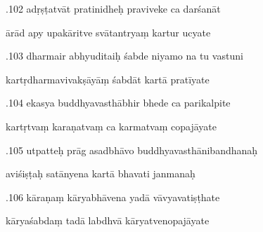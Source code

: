 \documentclass[article,12pt,a4paper]{memoir}%
\newcounter{parCount}
\begin{document}
	  
	  \pstart {}.102 adṛṣṭatvāt pratinidheḥ praviveke ca darśanāt 
	{}
	\pend%
      

	  
	  \pstart \leavevmode%
	ārād apy upakāritve svātantryaṃ kartur ucyate 
	{}
	\pend%
      

	  
	  \pstart {}.103 dharmair abhyuditaiḥ śabde niyamo na tu vastuni 
	{}
	\pend%
      

	  
	  \pstart \leavevmode%
	kartṛdharmavivakṣāyāṃ śabdāt kartā pratīyate 
	{}
	\pend%
      

	  
	  \pstart {}.104 ekasya buddhyavasthābhir bhede ca parikalpite 
	{}
	\pend%
      

	  
	  \pstart \leavevmode%
	kartṛtvaṃ karaṇatvaṃ ca karmatvaṃ copajāyate 
	{}
	\pend%
      

	  
	  \pstart {}.105 utpatteḥ prāg asadbhāvo   buddhyavasthānibandhanaḥ 
	{}
	\pend%
      

	  
	  \pstart \leavevmode%
	aviśiṣṭaḥ satānyena kartā bhavati janmanaḥ 
	{}
	\pend%
      

	  
	  \pstart {}.106 kāraṇaṃ kāryabhāvena yadā vāvyavatiṣṭhate 
	{}
	\pend%
      

	  
	  \pstart \leavevmode%
	kāryaśabdaṃ tadā labdhvā kāryatvenopajāyate 
	{}
	\pend%
      
\end{document}
